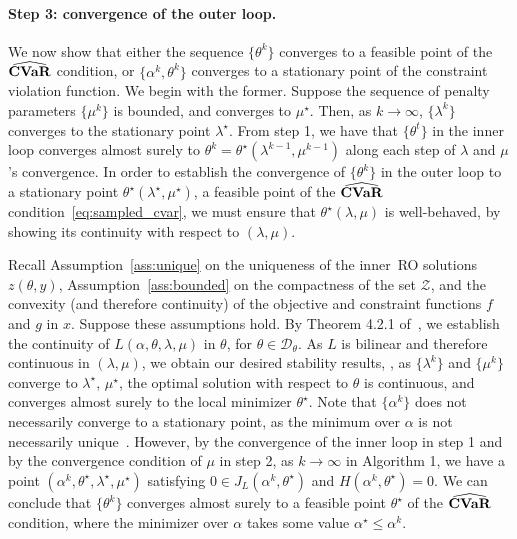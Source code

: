 \paragraph{Step 3: convergence of the outer loop.}
We now show that either the sequence $\{\theta^k\}$ converges to a feasible point of the $\widehat{\mathop{\bf CVaR}}$ condition, or $\{\alpha^k,\theta^k\}$
converges to a stationary point of the constraint violation function. 
We begin with the former. 
Suppose the sequence of penalty parameters $\{\mu^k\}$ is bounded, and converges to $\mu^\star$.
Then, as $k \to \infty$, $\{\lambda^k\}$ converges to the stationary point $\lambda^\star$.
From step 1, we have that $\{\theta^t\} $ in the inner loop converges almost surely to $\theta^k = \theta^\star(\lambda^{k-1},\mu^{k-1})$ along each step of $\lambda$ and $\mu$'s convergence. 
In order to establish the convergence of $\{\theta^k \}$ in the outer loop to a stationary point $\theta^\star(\lambda^\star, \mu^\star)$,  a feasible point of the $\widehat{\mathop{\bf CVaR}}$ condition~\eqref{eq:sampled_cvar}, we must ensure that $\theta^\star(\lambda, \mu)$ is well-behaved, by showing its continuity with respect to $(\lambda, \mu)$.



Recall Assumption~\ref{ass:unique} on the uniqueness of the inner~\gls{RO} solutions $z(\theta,y)$, Assumption~\ref{ass:bounded} on the compactness of the set $\mathcal{Z}$, and the convexity (and therefore continuity) of the objective and constraint functions $f$ and $g$ in $x$. Suppose these assumptions hold. By Theorem 4.2.1 of~\cite{parametric_stability}, we establish the continuity of $L(\alpha,\theta,\lambda,\mu)$ in $\theta$, for $\theta \in \mathcal{D}_\theta$. As $L$ is bilinear and therefore continuous in $(\lambda, \mu)$, we obtain our desired stability results, \ie, as $\{\lambda^k\}$ and $\{\mu^k\}$ converge to $\lambda^\star$, $\mu^\star$, the optimal solution with respect to $\theta$ is continuous, and converges almost surely to the local minimizer $\theta^\star$. 
Note that $\{\alpha^k\}$ does not necessarily converge to a stationary point, as the minimum over $\alpha$ is not necessarily unique~\cite[Theorem 2]{cvaropt}.
However, by the convergence of the inner loop in step 1 and by the convergence condition of $\mu$ in step 2, as $k\to \infty$ in Algorithm 1, we have a point $(\alpha^k,\theta^\star,\lambda^\star,\mu^\star)$ satisfying $0 \in J_L(\alpha^k,\theta^\star)$ and $H(\alpha^k,\theta^\star) = 0$.  
We can conclude that $ \{\theta^k\}$ converges almost surely to 
a feasible point  $\theta^\star$ of the $\widehat{\mathop{\bf CVaR}}$ condition, where the minimizer over $\alpha$ takes some value $\alpha^\star \leq \alpha^k$.


